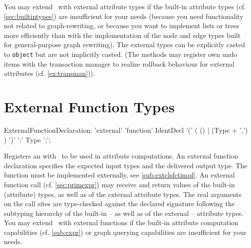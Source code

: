You may extend \GrG~with external attribute types if the built-in attribute types (cf. \ref{sec:builtintypes}) are insufficient for your needs (because you need functionality not related to graph-rewriting, or because you want to implement lists or trees more efficiently than with the implementation of the node and edge types built for general-purpose graph rewriting).
The external types can be explicitly casted to \texttt{object} but are not implicitly casted.
(The methods may register own undo items with the transaction manager to realize rollback behaviour for external attributes (cf. \ref{ex:transman})).

\section{External Function Types}\label{sub:extfct}
\begin{rail}
  ExternalFunctionDeclaration: 'external' 'function' IdentDecl '(' ( () | (Type + ',') ) ')' ':' Type ';';
\end{rail}
Registers an  with \GrG~to be used in attribute computations.
An external function declaration specifies the expected input types and the delivered output type.
The function must be implemented externally, see \ref{sub:extclsfctimpl}.
An external function call (cf. \ref{sec:primexpr}) may receive and return values of the built-in (attribute) types, as well as of the external attribute types.
The real arguments on the call sites are type-checked against the declared signature following the subtyping hierarchy of the built-in -- as well as of the external -- attribute types.
You may extend \GrG~with external functions if the built-in attribute computation capabilities (cf. \ref{sub:expr}) or graph querying capabilities are insufficient for your needs.


